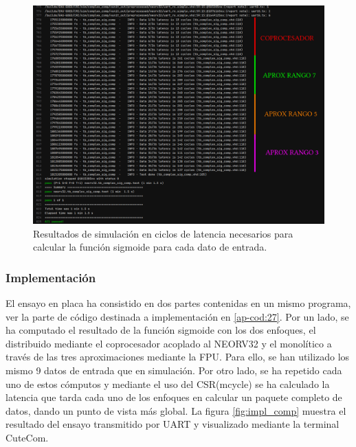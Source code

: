 \begin{figure}[H]
    \centering
    \includegraphics[width=14cm]{Figuras/SIM_RES_CI.png}
    \caption{Resultados de simulación en ciclos de latencia necesarios para calcular la función sigmoide para cada dato de entrada.}
    \label{fig:sim_comp}
\end{figure}

\subsubsection{Implementación}

El ensayo en placa ha consistido en dos partes contenidas en un mismo programa, ver la parte de código destinada a implementación en \ref{ap-cod:27}.
Por un lado, se ha computado el resultado de la función sigmoide con los dos enfoques, el distribuido mediante el coprocesador acoplado al NEORV32 y el monolítico a través de las tres aproximaciones mediante la FPU.
Para ello, se han utilizado los mismo 9 datos de entrada que en simulación.
Por otro lado, se ha repetido cada uno de estos cómputos y mediante el uso del CSR(mcycle) se ha calculado la latencia que tarda cada uno de los enfoques en calcular un paquete completo de datos, dando un punto de vista más global.
La figura \ref{fig:impl_comp} muestra el resultado del ensayo transmitido por UART y visualizado mediante la terminal CuteCom.

